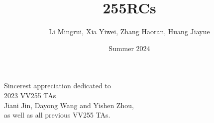 \documentclass{beamer}
\title{\LARGE 255RCs}
\author{ Li Mingrui, Xia Yiwei, Zhang Haoran, Huang Jiayue}
\date{Summer 2024}
\begin{document}
\maketitle
\begin{frame}
\begin{center}
\Large
    Sincerest appreciation dedicated to \\
    2023 VV255 TAs\\
    Jiani Jin, Dayong Wang and  Yishen Zhou,\\
    as well as all previous VV255 TAs.
    \normalsize
\end{center}
    
\end{frame}

\end{document}
